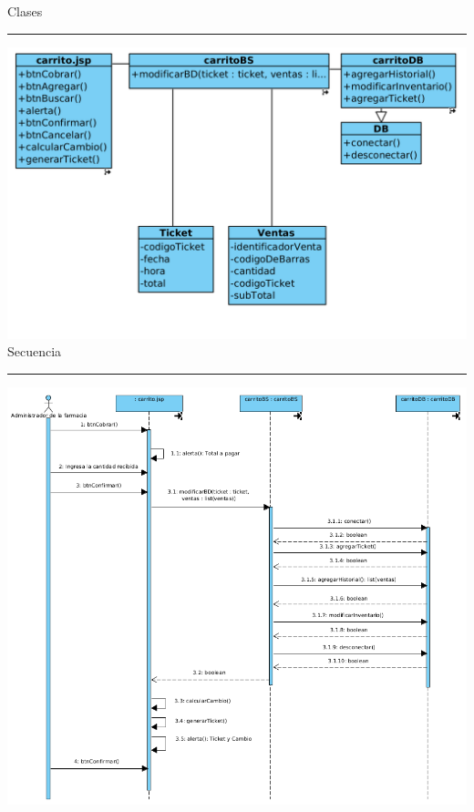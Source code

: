 {
\begin{flushleft}
	\newpage
	\Large{Clases}\\
	\rule{14cm}{0.5pt}

	\includegraphics[width=14cm]{casouso/cu1.1.5/images/clases.png}\\	

	\newpage
	\Large{Secuencia}\\
	\rule{14cm}{0.5pt}

	\includegraphics[width=14cm]{casouso/cu1.1.5/images/secuencias.png}\\	
	
\end{flushleft}
}
